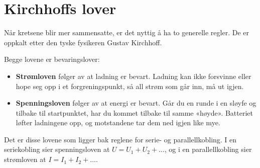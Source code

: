 


\section{Kirchhoffs lover}

Når kretsene blir mer sammensatte, er det nyttig å ha to generelle regler. De er oppkalt etter den tyske fysikeren Gustav Kirchhoff.


Begge lovene er bevaringslover:
\begin{itemize}
  \item \textbf{Strømloven} følger av at ladning er bevart. Ladning kan ikke forsvinne eller hope seg opp i et forgreningspunkt, så all strøm som går inn, må ut igjen.
  \item \textbf{Spenningsloven} følger av at energi er bevart. Går du en runde i en sløyfe og tilbake til startpunktet, har du kommet tilbake til samme «høyde». Batteriet løfter ladningene opp, og motstandene tar dem ned igjen like mye.
\end{itemize}

Det er disse lovene som ligger bak reglene for serie- og parallellkobling. I en seriekobling sier spenningsloven at $U = U_1 + U_2 + \dots$, og i en parallellkobling sier strømloven at $I = I_1 + I_2 + \dots$.

